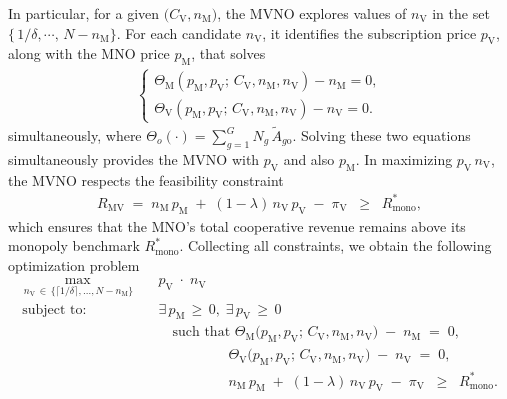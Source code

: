 \documentclass[12pt, draftclsnofoot, onecolumn]{IEEEtran}
\begin{document}
		
		In particular, for a given \(\bigl(C_{\mathrm{V}},n_{\mathrm{M}}\bigr)\), the MVNO explores values of \(n_{\mathrm{V}}\) in the set \(\{\,1/\delta,\cdots,\,N-n_{\mathrm{M}}\bigr\}\). For each candidate \(n_{\mathrm{V}}\), it  identifies the subscription price \(p_{\mathrm{V}}\), along with the MNO price \(p_{\mathrm{M}}\), that solves
		\begin{align}
			\begin{cases}
				\Theta_{\mathrm{M}}(p_{\mathrm{M}},p_{\mathrm{V}};\,C_{\mathrm{V}},n_{\mathrm{M}},n_{\mathrm{V}})- n_{\mathrm{M}}
				= 0, \\
				\Theta_{\mathrm{V}}(p_{\mathrm{M}},p_{\mathrm{V}};\,C_{\mathrm{V}},n_{\mathrm{M}},n_{\mathrm{V}})
				- n_{\mathrm{V}}= 0.
			\end{cases}
		\end{align}
		simultaneously, where \(\Theta_{o}(\cdot)=\sum_{g=1}^G N_g\,\tilde{A}_{g{\mathrm{o}}}\). Solving these two equations simultaneously provides the MVNO with \(p_{\mathrm{V}}\) and also \(p_{\mathrm{M}}\). In maximizing \(p_{\mathrm{V}}\,n_{\mathrm{V}}\), the MVNO respects the feasibility constraint
		\begin{align}
			R_{\mathrm{MV}}
			\;=\;
			n_{\mathrm{M}}\,p_{\mathrm{M}}
			\;+\;
			(1-\lambda)\,n_{\mathrm{V}}\,p_{\mathrm{V}}
			\;-\;
			\pi_{\mathrm{V}}
			\;\;\ge\;\;
			R_{\mathrm{mono}}^*,
		\end{align}
		which ensures that the MNO’s total cooperative revenue remains above its monopoly benchmark \(R_{\mathrm{mono}}^*\). 
		Collecting all constraints, we obtain the following optimization problem
		\vspace{-.2cm}
		\begin{equation}
			\begin{aligned}
				\max_{\,n_{\mathrm{V}}\,\in\,\{\lceil 1/\delta\rceil,\dots,N - n_{\mathrm{M}}\}}
				&\quad
				p_{\mathrm{V}}\;\cdot\;n_{\mathrm{V}}
				\\[-2pt]
				\text{subject to:}
				&\quad
				\exists\,p_{\mathrm{M}} \,\ge\,0,\;\exists\,p_{\mathrm{V}} \,\ge\,0
				\\[-2pt]
				&\qquad
				\text{such that }
				\Theta_{\mathrm{M}}\bigl(p_{\mathrm{M}},p_{\mathrm{V}};\,C_{\mathrm{V}},n_{\mathrm{M}},n_{\mathrm{V}}\bigr)\;-\;n_{\mathrm{M}}\;=\;0,
				\\
				&\qquad\quad\quad \quad\quad
				\Theta_{\mathrm{V}}\bigl(p_{\mathrm{M}},p_{\mathrm{V}};\,C_{\mathrm{V}},n_{\mathrm{M}},n_{\mathrm{V}}\bigr)\;-\;n_{\mathrm{V}}\;=\;0,
				\\
				&\qquad\quad\quad \quad\quad
				n_{\mathrm{M}}\,p_{\mathrm{M}}
				\;+\;
				(1-\lambda)\,n_{\mathrm{V}}\,p_{\mathrm{V}}
				\;-\;\pi_{\mathrm{V}}
				\;\;\ge\;\;R_{\mathrm{mono}}^*.
			\end{aligned}
		\end{equation}
\end{document}
